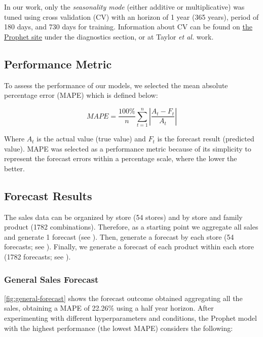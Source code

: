 In our work, only the \textit{seasonality mode}  (either additive or multiplicative)  was tuned using cross validation (CV) with an horizon of 1 year (365 years), period of 180 days, and 730 days for training. Information about CV can be found on \href{https://facebook.github.io/prophet/docs/installation.html}{the Prophet site} under the diagnostics section, or at Taylor \textit{et al.} work. 

\subsection[Performance Metric]{Performance Metric}
\label{sec:error}

To assess the performance of our models, we selected the mean absolute percentage error (MAPE) which is defined below:

\[ MAPE= \frac{100\%}{n} \sum_{t=1}^n \left| \frac{A_t - F_t}{A_t} \right|  \]

Where $A_t$ is the actual value (true value) and $F_t$ is the forecast result (predicted value). MAPE was selected as a performance metric because of its simplicity to represent the forecast errors within a percentage scale, where the lower the better. 

\subsection[Forecast Results]{Forecast Results}
\label{sec:results}

The sales data can be organized by store (54 stores) and by store and family product (1782 combinations). Therefore, as a starting point we aggregate all sales and generate 1 forecast (see ). Then, generate a forecast by each store (54 forecasts; see ). Finally, we generate a forecast of each product within each store (1782 forecasts; see ).

\subsubsection[General Sales Forecast]{General Sales Forecast}
\label{sec:general}

\autoref{fig:general-forecast} shows the forecast outcome obtained aggregating all the sales, obtaining a MAPE of 22.26\% using a half year horizon. After experimenting with different hyperparameters and conditions,  the Prophet model with the highest performance (the lowest MAPE) considers the following: 

